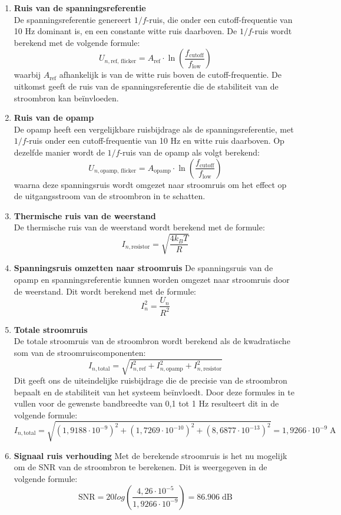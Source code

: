 \begin{enumerate}
    \item \textbf{Ruis van de spanningsreferentie} \\
    De spanningsreferentie genereert \(1/f\)-ruis, die onder een cutoff-frequentie van 10 Hz dominant is, en een constante witte ruis daarboven. De \(1/f\)-ruis wordt berekend met de volgende formule:
    \[
    U_{n,\text{ref, flicker}} = A_{\text{ref}} \cdot \ln\left(\frac{f_{\text{cutoff}}}{f_{\text{low}}}\right)
    \]
    waarbij \(A_{\text{ref}}\) afhankelijk is van de witte ruis boven de cutoff-frequentie. De uitkomst geeft de ruis van de spanningsreferentie die de stabiliteit van de stroombron kan beïnvloeden.

    \item \textbf{Ruis van de opamp} \\
    De opamp heeft een vergelijkbare ruisbijdrage als de spanningsreferentie, met \(1/f\)-ruis onder een cutoff-frequentie van 10 Hz en witte ruis daarboven. Op dezelfde manier wordt de \(1/f\)-ruis van de opamp als volgt berekend:
    \[
    U_{n,\text{opamp, flicker}} = A_{\text{opamp}} \cdot \ln\left(\frac{f_{\text{cutoff}}}{f_{\text{low}}}\right)
    \]
    waarna deze spanningsruis wordt omgezet naar stroomruis om het effect op de uitgangsstroom van de stroombron in te schatten.

    \item \textbf{Thermische ruis van de weerstand} \\
    De thermische ruis van de weerstand wordt berekend met de formule:
    \[
    I_{n,\text{resistor}} = \sqrt{\frac{4 k_B T}{R}}
    \]

    \item \textbf{Spanningsruis omzetten naar stroomruis}
    De spanningsruis van de opamp en spanningsreferentie kunnen worden omgezet naar stroomruis door de weerstand. Dit wordt berekend met de formule:
    \[
    I_{n}^2 = \frac{U_{n}}{R^2}
    \]

    \item \textbf{Totale stroomruis} \\
    De totale stroomruis van de stroombron wordt berekend als de kwadratische som van de stroomruiscomponenten:
    \[
    I_{n,\text{total}} = \sqrt{I_{n,\text{ref}}^2 + I_{n,\text{opamp}}^2 + I_{n,\text{resistor}}^2}
    \]
    Dit geeft ons de uiteindelijke ruisbijdrage die de precisie van de stroombron bepaalt en de stabiliteit van het systeem beïnvloedt. Door deze formules in te vullen voor de gewenste bandbreedte van 0,1 tot 1 Hz resulteert dit in de volgende formule:
    \[
    I_{n,\text{total}} = \sqrt{(1,9188 \cdot 10^{-9})^2 + (1,7269 \cdot 10^{-10})^2 + (8,6877 \cdot 10^{-13})^2} = 1,9266 \cdot 10^{-9}\; \text{A}
    \]

    \item \textbf{Signaal ruis verhouding}
    Met de berekende stroomruis is het nu mogelijk om de SNR van de stroombron te berekenen. Dit is weergegeven in de volgende formule:
    \[
    \text{SNR} = 20log(\frac{4,26 \cdot 10^{-5}}{1,9266 \cdot 10^{-9}}) = 86.906\; \text{dB}
    \]
\end{enumerate}
